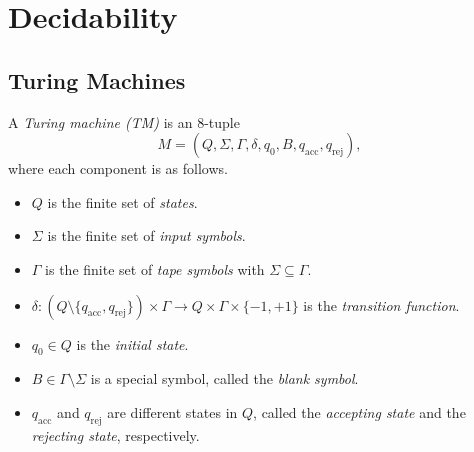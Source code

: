 \chapter{Decidability}
\section{Turing Machines}
\begin{definition}
  A \emph{Turing machine (TM)} is an 8-tuple
  \begin{equation*}
    M = (Q, \Sigma, \Gamma, \delta, q_0, B, q_\text{acc}, q_\text{rej}),
  \end{equation*}
  where each component is as follows.
  \begin{itemize}
    \item $Q$ is the finite set of \emph{states}.
    \item $\Sigma$ is the finite set of \emph{input symbols}.
    \item $\Gamma$ is the finite set of \emph{tape symbols} with
    $\Sigma \subseteq \Gamma$.
    \item $\delta : (Q \setminus \{q_\text{acc}, q_\text{rej}\}) \times \Gamma
    \to Q \times \Gamma \times \{-1, +1\}$ is the \emph{transition function}.
    \item $q_0 \in Q$ is the \emph{initial state}.
    \item $B \in \Gamma \setminus \Sigma$ is a special symbol, called the
    \emph{blank symbol}.
    \item $q_\text{acc}$ and $q_\text{rej}$ are different states in $Q$,
    called the \emph{accepting state} and the \emph{rejecting state},
    respectively.
  \end{itemize}
\end{definition}

